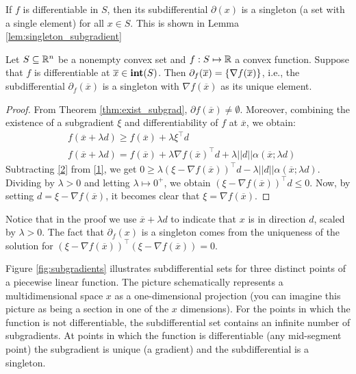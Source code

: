 If $f$ is differentiable in $S$, then its subdifferential $\partial(x)$ is a singleton (a set with a single element) for all $x \in S$. This is shown in Lemma \ref{lem:singleton_subgradient}
%
\begin{lemma}\label{lem:singleton_subgradient}
	Let $S \subseteq \mathbb{R}^n$ be a nonempty convex set and $f:S \mapsto \mathbb{R}$ a convex function. Suppose that $f$ is differentiable at $\overline{x} \in \mathop{\bf int}(S)$. Then $\partial_f(\overline{x}) = \left\{ \nabla f(\overline{x}) \right \}$, i.e., the subdifferential $\partial_f(\overline{x})$ is a singleton with $\nabla f(\overline{x})$ as its unique element.
\end{lemma}
%
\begin{proof}
	From Theorem \ref{thm:exist_subgrad}, $\partial f(\overline{x}) \neq \emptyset$. Moreover, combining the existence of a subgradient $\xi$ and differentiability of $f$ at $\overline{x}$, we obtain:
	\begin{align}
	&f(\overline{x} + \lambda d) \geq f(\overline{x}) + \lambda \xi^\top d \label{1}\\
	&f(\overline{x} + \lambda d) = f(\overline{x}) + \lambda \nabla f(\overline{x})^\top d + \lambda ||d||\alpha(\overline{x}; \lambda d) \label{2}
	\end{align}
	Subtracting \eqref{2} from \eqref{1}, we get 
	$
	0 \geq \lambda(\xi - \nabla f(\overline{x}))^\top d -\lambda ||d||\alpha(\overline{x}; \lambda d).
	$
	Dividing by $\lambda > 0$ and letting $\lambda \mapsto 0^+$, we obtain $(\xi - \nabla f(\overline{x}))^\top d \leq 0$. Now, by setting $d = \xi - \nabla f(\overline{x})$, it becomes clear that $\xi = \nabla f(\overline{x})$.
\end{proof}

Notice that in the proof we use $\overline{x} + \lambda d$ to indicate that $x$ is in direction $d$, scaled by $\lambda > 0$. The fact that $\partial_f(x)$ is a singleton comes from the uniqueness of the solution for $(\xi - \nabla f(\overline{x}))^\top(\xi - \nabla f(\overline{x})) = 0$.

Figure \ref{fig:subgradients} illustrates subdifferential sets for three distinct points of a piecewise linear function. The picture schematically represents a multidimensional space $x$ as a one-dimensional projection (you can imagine this picture as being a section in one of the $x$ dimensions). For the points in which the function is not differentiable, the subdifferential set contains an infinite number of subgradients. At points in which the function is differentiable (any mid-segment point) the subgradient is unique (a gradient) and the subdifferential is a singleton.


